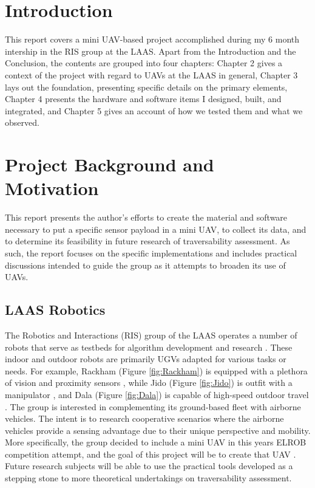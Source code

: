 \documentclass[a4paper,11pt]{report}
\begin{document}
\chapter{Introduction}

This report covers a mini UAV-based project accomplished during my 6 month intership in the RIS group at the LAAS. Apart from the Introduction and the Conclusion, the contents are grouped into four chapters: Chapter 2 gives a context of the project with regard to UAVs at the LAAS in general, Chapter 3 lays out the foundation, presenting specific details on the primary elements, Chapter 4 presents the hardware and software items I designed, built, and integrated, and Chapter 5 gives an account of how we tested them and what we observed.

\chapter{Project Background and Motivation}

This report presents the author's efforts to create the material and software necessary to put a specific sensor payload in a mini UAV, to collect its data, and to determine its feasibility in future research of traversability assessment.  As such, the report focuses on the specific implementations and includes practical discussions intended to guide the group as it attempts to broaden its use of UAVs.

\section{LAAS Robotics}

The Robotics and Interactions (RIS) group of the LAAS operates a number of robots that serve as testbeds for algorithm development and research \cite{ugvs}. These indoor and outdoor robots are primarily UGVs adapted for various tasks or needs. For example, Rackham (Figure \ref{fig:Rackham}) is equipped with a plethora of vision and proximity sensors \cite{rackham}, while Jido (Figure \ref{fig:Jido}) is outfit with a manipulator \cite{jido}, and Dala (Figure \ref{fig:Dala}) is capable of high-speed outdoor travel \cite{dala}. The group is interested in complementing its ground-based fleet with airborne vehicles. The intent is to research cooperative scenarios where the airborne vehicles provide a sensing advantage due to their unique perspective and mobility. More specifically, the group decided to include a mini UAV in this years ELROB competition attempt, and the goal of this project will be to create that UAV \cite{this}. Future research subjects will be able to use the practical tools developed as a stepping stone to more theoretical undertakings on traversability assessment.
\end{document}
